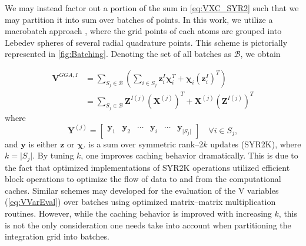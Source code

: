 We may instead factor out a portion of the sum in \cref{eq:VXC_SYR2} such that
we may partition it into sum over batches of points.  In this work, we utilize a
macrobatch approach \cite{Frisch96_213}, where the grid points of each atoms are
grouped  into Lebedev spheres \cite{Lebedev77_99} of several radial quadrature points. This scheme
is pictorially represented in \cref{fig:Batching}. Denoting the set of all batches
as $\mathscr B$, we obtain

\begin{align}
\label{eq:VXC_SYR2K}
\mathbf{V}^{GGA,I} &= \sum_{S_j \in \mathscr B} \left(\sum_{i\in S_j} \mathbf{z}^I_i \boldsymbol{\chi}_i^T + \boldsymbol{\chi}_i \left(\mathbf{z}^I_i\right)^T \right) \nonumber \\
&= \sum_{S_j \in \mathscr B} \mathbf{Z}^{I(j)} \left(\mathbf{X}^{(j)}\right)^T + \mathbf{X}^{(j)} \left(\mathbf{Z}^{I(j)}\right)^T
\end{align}
where
\begin{equation}
\mathbf{Y}^{(j)} = \begin{bmatrix} \mathbf{y}_1 & \mathbf{y}_{2} & \cdots & \mathbf{y}_i & \cdots &\mathbf{y}_{\vert S_j \vert} \end{bmatrix} \quad \forall i\in S_j,
\end{equation}
and $\mathbf{y}$ is either $\mathbf{z}$ or $\boldsymbol{\chi}$.  is a sum over symmetric rank--2$k$ updates (SYR2K), where $k = \vert S_j \vert$. By tuning
$k$, one improves caching behavior dramatically. This is due to the fact that optimized implementations of SYR2K operations utilized efficient block
operations to optimize the flow of data to and from the computational caches. 
 Similar schemes may
developed for the evaluation of the V variables (\cref{eq:VVarEval}) over batches using optimized matrix--matrix multiplication routines. However, while the caching behavior
is improved with increasing $k$, this is not the only consideration one needs take into account when partitioning the integration grid into batches.

